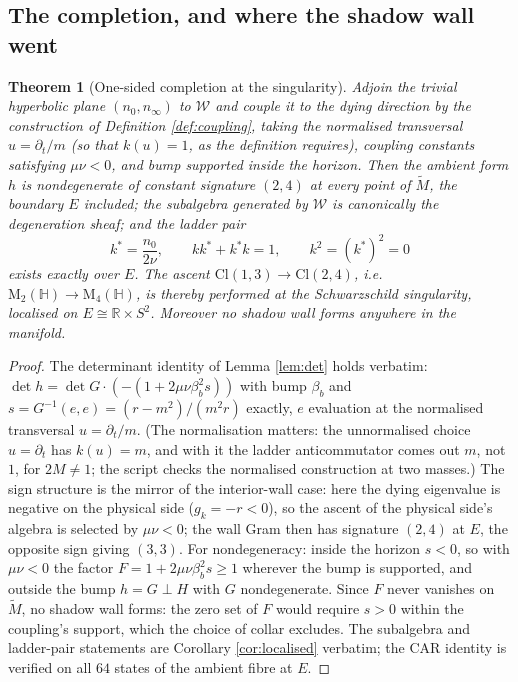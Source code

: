\documentclass[11pt]{article}
\newtheorem{theorem}{Theorem}[section]
\theoremstyle{definition}
\newcommand{\Cl}{\mathrm{Cl}}
\newcommand{\R}{\mathbb{R}}
\newcommand{\HH}{\mathbb{H}}
\newcommand{\Mat}{\mathrm{M}}
\newcommand{\nO}{n_0}
\newcommand{\nInf}{n_\infty}
\newcommand{\shW}{\mathcal{W}}
\newcommand{\Mt}{\widetilde{M}}
\begin{document}
\subsection{The completion, and where the shadow wall went}\label{subsec:schwcompletion}

\begin{theorem}[One-sided completion at the singularity]\label{thm:schwcompletion}
Adjoin the trivial hyperbolic plane $(\nO, \nInf)$ to $\shW$ and couple it to the dying direction by the construction of Definition \ref{def:coupling}, taking the normalised transversal $u = \partial_t/m$ (so that $k(u) = 1$, as the definition requires), coupling constants satisfying $\mu\nu < 0$, and bump supported inside the horizon. Then the ambient form $h$ is nondegenerate of constant signature $(2,4)$ at every point of $\Mt$, the boundary $E$ included; the subalgebra generated by $\shW$ is canonically the degeneration sheaf; and the ladder pair
\[
k^* = \frac{\nO}{2\nu}, \qquad k k^* + k^* k = 1, \qquad k^2 = (k^*)^2 = 0
\]
exists exactly over $E$. The ascent $\Cl(1,3) \to \Cl(2,4)$, i.e.\ $\Mat_2(\HH) \to \Mat_4(\HH)$, is thereby performed at the Schwarzschild singularity, localised on $E \cong \R \times S^2$. Moreover no shadow wall forms anywhere in the manifold.
\end{theorem}

\begin{proof}
The determinant identity of Lemma \ref{lem:det} holds verbatim: $\det h = \det G \cdot (-(1 + 2\mu\nu\beta_b^2 s))$ with bump $\beta_b$ and $s = G^{-1}(e,e) = (r - m^2)/(m^2 r)$ exactly, $e$ evaluation at the normalised transversal $u = \partial_t/m$. (The normalisation matters: the unnormalised choice $u = \partial_t$ has $k(u) = m$, and with it the ladder anticommutator comes out $m$, not $1$, for $2M \neq 1$; the script checks the normalised construction at two masses.) The sign structure is the mirror of the interior-wall case: here the dying eigenvalue is negative on the physical side ($g_k = -r < 0$), so the ascent of the physical side's algebra is selected by $\mu\nu < 0$; the wall Gram then has signature $(2,4)$ at $E$, the opposite sign giving $(3,3)$. For nondegeneracy: inside the horizon $s < 0$, so with $\mu\nu < 0$ the factor $F = 1 + 2\mu\nu\beta_b^2 s \geq 1$ wherever the bump is supported, and outside the bump $h = G \perp H$ with $G$ nondegenerate. Since $F$ never vanishes on $\Mt$, no shadow wall forms: the zero set of $F$ would require $s > 0$ within the coupling's support, which the choice of collar excludes. The subalgebra and ladder-pair statements are Corollary \ref{cor:localised} verbatim; the CAR identity is verified on all $64$ states of the ambient fibre at $E$.
\end{proof}
\end{document}
